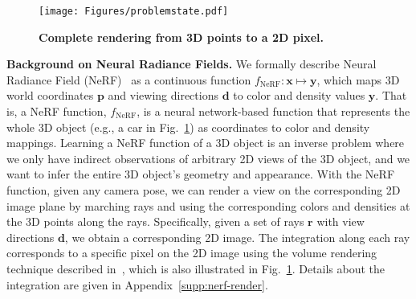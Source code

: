 



\begin{figure}[htbp]
\centering
\centerline{
\texttt{[image: Figures/problemstate.pdf]} 
} 
\caption{\textbf{Complete rendering from 3D points to a 2D pixel.}
}
\label{fig:problem}
\end{figure}

\textbf{Background on Neural Radiance Fields.}
We formally describe Neural Radiance Field (NeRF)~\citep{mildenhall2021nerf, arandjelovic2021nerf} as a continuous function \( f_{\text{NeRF}}: \mathbf{x} \mapsto \mathbf{y} \), which maps 3D world coordinates \(\mathbf{p}\) and viewing directions \(\mathbf{d}\) to color and density values \(\mathbf{y}\). 
That is, a NeRF function, \( f_{\text{NeRF}} \), is a neural network-based function that represents the whole 3D object (e.g., a car in Fig.~\ref{fig:problem}) as coordinates to color and density mappings. Learning a NeRF function of a 3D object is an inverse problem where we only have indirect observations of arbitrary 2D views of the 3D object, and we want to infer the entire 3D object's geometry and appearance.
With the NeRF function, given any camera pose, we can render a view on the corresponding 2D image plane by marching rays and using the corresponding colors and densities at the 3D points along the rays. Specifically, given a set of rays \(\mathbf{r}\) with view directions \(\mathbf{d}\), we obtain a corresponding 2D image. The integration along each ray corresponds to a specific pixel on the 2D image using the volume rendering technique described in~\cite{kajiya1984ray}, which is also illustrated in Fig.~\ref{fig:problem}. Details about the integration are given in Appendix~\ref{supp:nerf-render}. 



%


